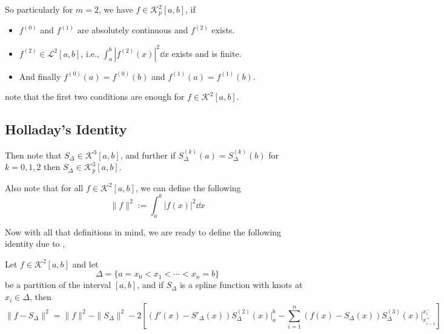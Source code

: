 So particularly for $m = 2$, we have $f \in \mathcal{K}^2_p[a,b]$, if 
\begin{itemize}
    \item $f^{(0)}$ and $f^{(1)}$ are absolutely continuous and $f^{(2)}$ exists. 
    \item $f^{(2)} \in \mathcal{L}^2[a,b]$, i.e., $\int_a^b |f^{(2)}(x)|^2 \dd{x}$ exists and is finite. 
    \item And finally $f^{(0)}(a) = f^{(0)}(b)$ and $f^{(1)}(a) = f^{(1)}(b)$.
\end{itemize}
note that the first two conditions are enough for $f \in \mathcal{K}^2[a,b]$.

\subsection{Holladay's Identity} 

Then note that $S_{\Delta} \in \mathcal{K}^3[a,b]$, and further if $S_{\Delta}^{(k)}(a) = S_{\Delta}^{(k)}(b)$ for $k = 0,1,2$ then $S_{\Delta} \in \mathcal{K}^3_p[a,b]$.

Also note that for all $ f \in \mathcal{K}^2[a,b]$, we can define the following  
\begin{equation}\label{eq3:mar25A}
    \| f \|^2 := \int_a^b |f(x)|^2 \dd{x} 
\end{equation} 

Now with all that definitions in mind, we are ready to define the following identity due to ,
\begin{thm}\label{thm1:mar25A}
    Let $f \in \mathcal{K}^2[a,b]$ and let \[\Delta = \{ a = x_0 < x_1 < \cdots < x_n = b \} \] be a partition of the interval $[a,b]$, and if $S_{\Delta}$ is a spline function with knots at $x_i \in \Delta$, then 
    \[
        \| f - S_{\Delta} \|^2 = \| f \|^2 - \| S_{\Delta} \|^2 - 2 \left[ (f'(x) - S'_{\Delta}(x))S^{(2)}_{\Delta}(x) \Big\vert_a^b - \sum_{i=1}^n (f(x) - S_{\Delta}(x)) S^{(3)}_{\Delta}(x) \Big\vert_{x_{i-1}^+}^{x_i^-}  \right]  
    \] 
\end{thm}

